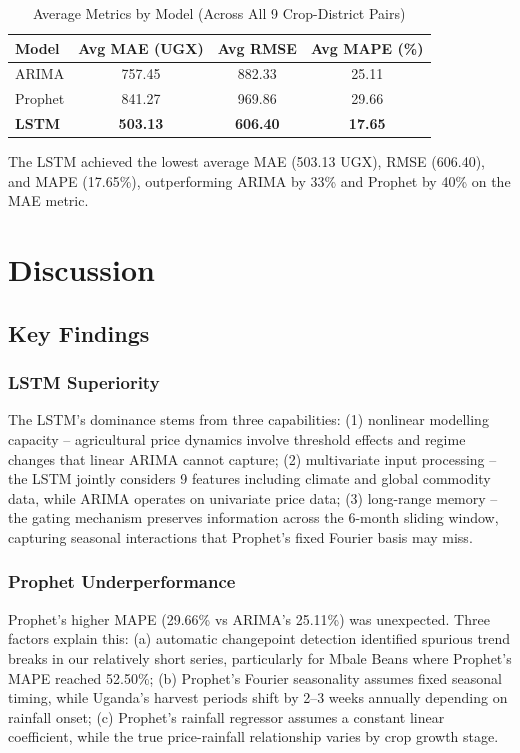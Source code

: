 \documentclass[12pt,a4paper]{article}
\begin{document}
\begin{table}[H]
\centering
\caption{Average Metrics by Model (Across All 9 Crop-District Pairs)}
\label{tab:avg_results}
\begin{tabular}{lccc}
\toprule
\textbf{Model} & \textbf{Avg MAE (UGX)} & \textbf{Avg RMSE} & \textbf{Avg MAPE (\%)} \\
\midrule
ARIMA & 757.45 & 882.33 & 25.11 \\
Prophet & 841.27 & 969.86 & 29.66 \\
\textbf{LSTM} & \textbf{503.13} & \textbf{606.40} & \textbf{17.65} \\
\bottomrule
\end{tabular}
\end{table}

The LSTM achieved the lowest average MAE (503.13 UGX), RMSE (606.40), and MAPE (17.65\%), outperforming ARIMA by 33\% and Prophet by 40\% on the MAE metric.

\section{Discussion}

\subsection{Key Findings}

\subsubsection{LSTM Superiority}
The LSTM's dominance stems from three capabilities: (1) nonlinear modelling capacity -- agricultural price dynamics involve threshold effects and regime changes that linear ARIMA cannot capture; (2) multivariate input processing -- the LSTM jointly considers 9 features including climate and global commodity data, while ARIMA operates on univariate price data; (3) long-range memory -- the gating mechanism preserves information across the 6-month sliding window, capturing seasonal interactions that Prophet's fixed Fourier basis may miss.

\subsubsection{Prophet Underperformance}
Prophet's higher MAPE (29.66\% vs ARIMA's 25.11\%) was unexpected. Three factors explain this: (a) automatic changepoint detection identified spurious trend breaks in our relatively short series, particularly for Mbale Beans where Prophet's MAPE reached 52.50\%; (b) Prophet's Fourier seasonality assumes fixed seasonal timing, while Uganda's harvest periods shift by 2--3 weeks annually depending on rainfall onset; (c) Prophet's rainfall regressor assumes a constant linear coefficient, while the true price-rainfall relationship varies by crop growth stage.
\end{document}
